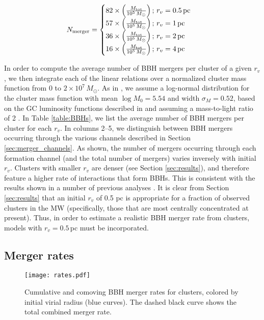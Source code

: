 \documentclass[twocolumn,tighten]{aastex63}
\begin{document}
\begin{multline}
\label{eq:best_fits}
    N_{\rm{merger}} = \begin{cases}
    82 \times \Big(\frac{M_{\rm{tot}}}{10^5\,M_{\odot}} \Big) \,;\,r_v=0.5\,\rm{pc}\\
    57 \times \Big(\frac{M_{\rm{tot}}}{10^5\,M_{\odot}} \Big) \,;\,r_v=1\,\rm{pc}\\
    36 \times \Big(\frac{M_{\rm{tot}}}{10^5\,M_{\odot}} \Big) \,;\,r_v=2\,\rm{pc}\\
    16 \times \Big(\frac{M_{\rm{tot}}}{10^5\,M_{\odot}} \Big) \,;\,r_v=4\,\rm{pc}\\
    \end{cases}
\end{multline}

In order to compute the average number of BBH mergers per cluster of a given $r_v$, we then integrate each of the linear relations over a normalized cluster mass function from 0 to $2\times10^7\,M_{\odot}$. As in \citet{Rodriguez2015a}, we assume a log-normal distribution for the cluster mass function with mean $\log M_0 = 5.54$ and width $\sigma_M = 0.52$, based on the GC luminosity functions described in \citet{Harris2014} and assuming a mass-to-light ratio of 2 \citep{Bell2003}. In Table \ref{table:BBHs}, we list the average number of BBH mergers per cluster for each $r_v$. In columns 2--5, we distinguish between BBH mergers occurring through the various channels described in Section \ref{sec:merger_channels}. As shown, the number of mergers occurring through each formation channel (and the total number of mergers) varies inversely with initial $r_v$. Clusters with smaller $r_v$ are denser (see Section \ref{sec:results}), and therefore feature a higher rate of interactions that form BBHs. This is consistent with the results shown in a number of previous analyses \citep[e.g.,][]{Rodriguez2016a,Zevin2018,Choksi2018}. It is clear from Section \ref{sec:results} that an initial $r_v$ of 0.5 pc is appropriate for a fraction of observed clusters in the MW (specifically, those that are most centrally concentrated at present). Thus, in order to estimate a realistic BBH merger rate from clusters, models with $r_v=0.5\,$pc must be incorporated.

\subsection{Merger rates}
\label{sec:rates}

\begin{figure}
\begin{center}
\texttt{[image: rates.pdf]}
\caption{\footnotesize \label{fig:BBHrates} Cumulative and comoving BBH merger rates for clusters, colored by initial virial radius (blue curves). The dashed black curve shows the total combined merger rate.}
\end{center}
\end{figure}
\end{document}
